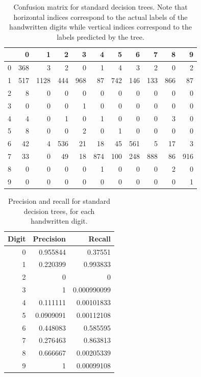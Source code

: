 \begin{table}
	\begin{tabular}{r|rrrrrrrrrr}
		&   0 &    1 &   2 &   3 &   4 &   5 &   6 &   7 &   8 &   9 \\
		\hline
		0 & 368 &    3 &   2 &   0 &   1 &   4 &   3 &   2 &   0 &   2 \\
		1 & 517 & 1128 & 444 & 968 &  87 & 742 & 146 & 133 & 866 &  87 \\
		2 &   8 &    0 &   0 &   0 &   0 &   0 &   0 &   0 &   0 &   0 \\
		3 &   0 &    0 &   0 &   1 &   0 &   0 &   0 &   0 &   0 &   0 \\
		4 &   4 &    0 &   1 &   0 &   1 &   0 &   0 &   0 &   3 &   0 \\
		5 &   8 &    0 &   0 &   2 &   0 &   1 &   0 &   0 &   0 &   0 \\
		6 &  42 &    4 & 536 &  21 &  18 &  45 & 561 &   5 &  17 &   3 \\
		7 &  33 &    0 &  49 &  18 & 874 & 100 & 248 & 888 &  86 & 916 \\
		8 &   0 &    0 &   0 &   0 &   1 &   0 &   0 &   0 &   2 &   0 \\
		9 &   0 &    0 &   0 &   0 &   0 &   0 &   0 &   0 &   0 &   1 \\
	\end{tabular}
	\caption{Confusion matrix for standard decision trees.  Note that horizontal indices correspond to the actual labels of the handwritten digits while vertical indices correspond to the labels predicted by the tree.}
	\label{table:no_kd_confusion}
\end{table}

\begin{table}
	\centering
	\begin{tabular}{rrr}
		Digit &   Precision &      Recall \\
		\hline
		0 &   0.955844  & 0.37551     \\
		1 &   0.220399  & 0.993833    \\
		2 &   0         & 0           \\
		3 &   1         & 0.000990099 \\
		4 &   0.111111  & 0.00101833  \\
		5 &   0.0909091 & 0.00112108  \\
		6 &   0.448083  & 0.585595    \\
		7 &   0.276463  & 0.863813    \\
		8 &   0.666667  & 0.00205339  \\
		9 &   1         & 0.00099108  \\
	\end{tabular}
	\caption{Precision and recall for standard decision trees, for each handwritten digit.}
	\label{table:no_kd_precision_recall}
\end{table}

